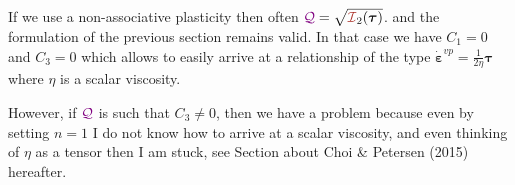 \begin{remark}
If we use a non-associative plasticity then often $\QQQ=\sqrt{{\III}_2(\bm\tau)}$.
and the formulation of the previous section remains valid. In that case 
we have $C_1=0$ and $C_3=0$ which allows to easily arrive at a relationship 
of the type $\dot{\bm\varepsilon}^{vp} = \frac{1}{2\eta} \bm\tau$ where 
$\eta$ is a scalar viscosity. 

However, if ${\color{violet}\cal Q}$ is such that $C_3\neq 0$, then we have a problem because 
even by setting $n=1$ I do not know how to arrive at a scalar viscosity, 
and even thinking of $\eta$ as a tensor then I am stuck, see Section about 
Choi \& Petersen (2015) hereafter.
\end{remark}







